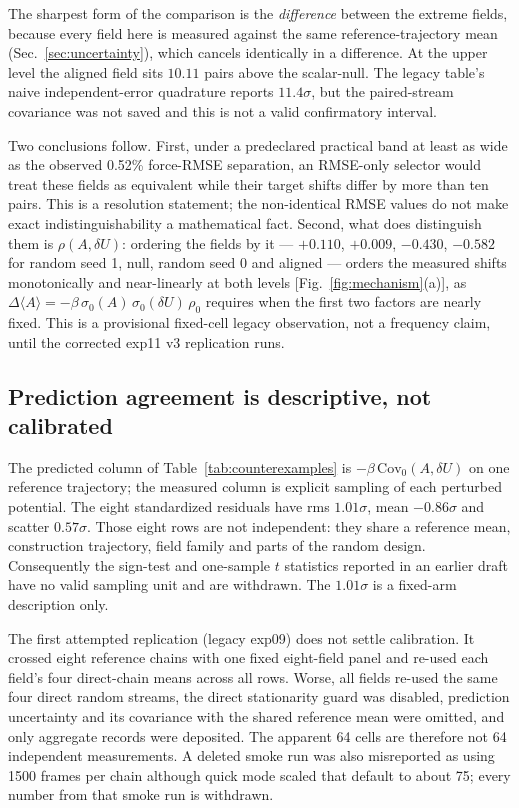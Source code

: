 \documentclass[aip,jcp,reprint,amsmath,amssymb,floatfix]{revtex4-2}
\newcommand{\dU}{\ensuremath{\delta U}}
\newcommand{\avg}[1]{\ensuremath{\langle #1 \rangle}}
\newcommand{\Cov}{\ensuremath{\mathrm{Cov}}}
\begin{document}
The sharpest form of the comparison is the \emph{difference} between the
extreme fields, because every field here is measured against the same
reference-trajectory mean (Sec.~\ref{sec:uncertainty}), which cancels
identically in a difference. At the upper level the aligned field sits
$10.11$ pairs above the scalar-null. The legacy table's naive independent-error
quadrature reports $11.4\sigma$, but the paired-stream covariance was not saved
and this is not a valid confirmatory interval.

Two conclusions follow. First, under a predeclared practical band at least as
wide as the observed 0.52\% force-RMSE separation, an RMSE-only selector would
treat these fields as equivalent while their target shifts differ by more than
ten pairs. This is a resolution statement; the non-identical RMSE values do not
make exact indistinguishability a mathematical fact. Second, what does distinguish
them is $\rho(A,\dU)$: ordering the fields by it ---
$+0.110$, $+0.009$, $-0.430$, $-0.582$ for random seed 1, null, random seed 0
and aligned --- orders the measured shifts monotonically and near-linearly at
both levels [Fig.~\ref{fig:mechanism}(a)], as
$\Delta\avg{A} = -\beta\,\sigma_0(A)\,\sigma_0(\dU)\,\rho_0$ requires when the
first two factors are nearly fixed. This is a provisional fixed-cell legacy
observation, not a frequency claim, until the corrected exp11 v3 replication runs.

\subsection{Prediction agreement is descriptive, not calibrated}
\label{sec:prediction}

The predicted column of Table~\ref{tab:counterexamples} is
$-\beta\,\Cov_0(A,\dU)$ on one reference trajectory; the measured column is
explicit sampling of each perturbed potential. The eight standardized residuals
have rms $1.01\sigma$, mean $-0.86\sigma$ and scatter $0.57\sigma$. Those eight
rows are not independent: they share a reference mean, construction trajectory,
field family and parts of the random design. Consequently the sign-test and
one-sample $t$ statistics reported in an earlier draft have no valid sampling
unit and are withdrawn. The $1.01\sigma$ is a fixed-arm description only.

The first attempted replication (legacy exp09) does not settle calibration. It
crossed eight reference chains with one fixed eight-field panel and re-used each
field's four direct-chain means across all rows. Worse, all fields re-used the
same four direct random streams, the direct stationarity guard was disabled,
prediction uncertainty and its covariance with the shared reference mean were
omitted, and only aggregate records were deposited. The apparent 64 cells are
therefore not 64 independent measurements. A deleted smoke run was also
misreported as using 1500 frames per chain although quick mode scaled that
default to about 75; every number from that smoke run is withdrawn.
\end{document}
